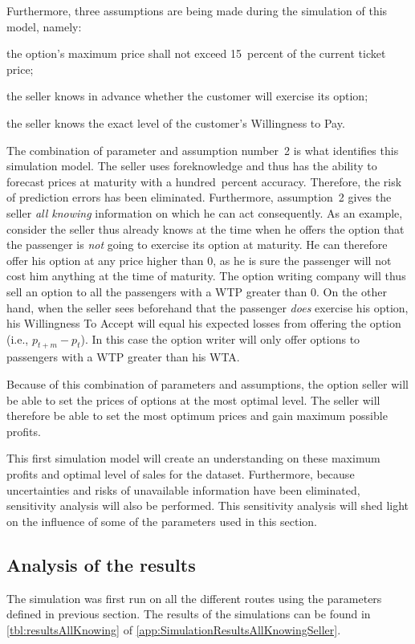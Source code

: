 Furthermore, three assumptions are being made during the simulation of this model, namely:
\begin{compactenum}
\item the option's maximum price shall not exceed 15~percent of the current ticket price;
\item the seller knows in advance whether the customer will exercise its option;
\item the seller knows the exact level of the customer's Willingness to Pay.
\end{compactenum}


The combination of parameter and assumption number~2 is what identifies this simulation model. The seller uses foreknowledge and thus has the ability to forecast prices at maturity with a hundred~percent accuracy. Therefore, the risk of prediction errors has been eliminated. Furthermore, assumption~2 gives the seller \emph{all knowing} information on which he can act consequently. As an example, consider the seller thus already knows at the time when he offers the option that the passenger is \emph{not} going to exercise its option at maturity. He can therefore offer his option at any price higher than 0, as he is sure the passenger will not cost him anything at the time of maturity. The option writing company will thus sell an option to all the passengers with a WTP greater than 0. On the other hand, when the seller sees beforehand that the passenger \emph{does} exercise his option, his Willingness To Accept will equal his expected losses from offering the option (i.e., $p_{t+m} - p_t$). In this case the option writer will only offer options to passengers with a WTP greater than his WTA.

Because of this combination of parameters and assumptions, the option seller will be able to set the prices of options at the most optimal level. The seller will therefore be able to set the most optimum prices and gain maximum possible profits.

This first simulation model will create an understanding on these maximum profits and optimal level of sales for the dataset. Furthermore, because uncertainties and risks of unavailable information have been eliminated, sensitivity analysis will also be performed. This sensitivity analysis will shed light on the influence of some of the parameters used in this section.


\subsection{Analysis of the results}
\label{subsec:AnalysisOfAllKnowing}
The simulation was first run on all the different routes using the parameters defined in previous section. The results of the simulations can be found in \autoref{tbl:resultsAllKnowing} of \autoref{app:SimulationResultsAllKnowingSeller}.

